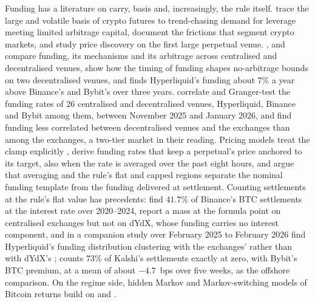 \documentclass[10pt,a4paper]{article}
\begin{document}
Funding has a literature on carry, basis and, increasingly, the rule itself. \citet{schmeling2025crypto} trace the large and volatile basis of crypto futures to trend-chasing demand for leverage meeting limited arbitrage capital, \citet{makarov2020trading} document the frictions that segment crypto markets, and \citet{alexander2020bitmex} study price discovery on the first large perpetual venue. \citet{werapun2026funding}, \citet{chen2024perpetual} and \citet{erez2026venues} compare funding, its mechanisms and its arbitrage across centralised and decentralised venues, \citet{erez2026timing} show how the timing of funding shapes no-arbitrage bounds on two decentralised venues, and \citet{lau2026carry} finds Hyperliquid's funding about $7\%$ a year above Binance's and Bybit's over three years. \citet{zhivkov2026funding,zhivkov2026temporal} correlate and Granger-test the funding rates of 26 centralised and decentralised venues, Hyperliquid, Binance and Bybit among them, between November 2025 and January 2026, and find funding less correlated between decentralised venues and the exchanges than among the exchanges, a two-tier market in their reading. Pricing models treat the clamp explicitly \citep{hugonnier2025clamp,he2022perp}, \citet{kim2025funding} derive funding rates that keep a perpetual's price anchored to its target, also when the rate is averaged over the past eight hours, and \citet{hewangzhang2026} argue that averaging and the rule's flat and capped regions separate the nominal funding template from the funding delivered at settlement. Counting settlements at the rule's flat value has precedents: \citet{he2022perp} find $41.7\%$ of Binance's BTC settlements at the interest rate over 2020--2024, \citet{ahmed2026event} report a mass at the formula point on centralised exchanges but not on dYdX, whose funding carries no interest component, and in a companion study over February 2025 to February 2026 find Hyperliquid's funding distribution clustering with the exchanges' rather than with dYdX's \citep{ahmed2026interest}; \citet{lim2026rarely,lim2026inaction} counts $73\%$ of Kalshi's settlements exactly at zero, with Bybit's BTC premium, at a mean of about $-4.7$~bps over five weeks, as the offshore comparison. On the regime side, hidden Markov and Markov-switching models of Bitcoin returns \citep{giudici2020,koki2022bitcoin,machimbo2025,ardia2019} build on \citet{hamilton1989} and \citet{rabiner1989}.
\end{document}
